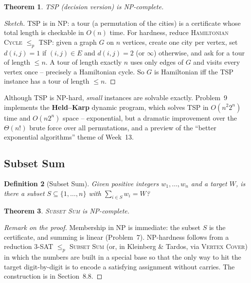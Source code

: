 \documentclass[11pt]{article}
\newtheorem{theorem}{Theorem}[section]
\newtheorem{definition}[theorem]{Definition}
\begin{document}
\begin{theorem}
\textsc{TSP} (decision version) is NP-complete.
\end{theorem}

\begin{proof}[Sketch]
\textsc{TSP} is in $\mathrm{NP}$: a tour (a permutation of the cities) is a certificate
whose total length is checkable in $O(n)$ time. For hardness, reduce \textsc{Hamiltonian
Cycle} $\le_p$ \textsc{TSP}: given a graph $G$ on $n$ vertices, create one city per vertex,
set $d(i, j) = 1$ if $(i, j) \in E$ and $d(i, j) = 2$ (or $\infty$) otherwise, and ask for
a tour of length $\le n$. A tour of length exactly $n$ uses only edges of $G$ and visits
every vertex once -- precisely a Hamiltonian cycle. So $G$ is Hamiltonian iff the TSP
instance has a tour of length $\le n$.
\end{proof}

Although TSP is NP-hard, \emph{small} instances are solvable exactly. Problem~9 implements
the \textbf{Held--Karp} dynamic program, which solves TSP in $O(n^2 2^n)$ time and $O(n
2^n)$ space -- exponential, but a dramatic improvement over the $\Theta(n!)$ brute force
over all permutations, and a preview of the ``better exponential algorithms'' theme of
Week~13.

\subsection{Subset Sum}

\begin{definition}[Subset Sum]
Given positive integers $w_1, \ldots, w_n$ and a target $W$, is there a subset $S \subseteq
\{1, \ldots, n\}$ with $\sum_{i \in S} w_i = W$?
\end{definition}

\begin{theorem}
\textsc{Subset Sum} is NP-complete.
\end{theorem}

\begin{proof}[Remark on the proof]
Membership in $\mathrm{NP}$ is immediate: the subset $S$ is the certificate, and summing is
linear (Problem~7). NP-hardness follows from a reduction \textsc{3-SAT} $\le_p$
\textsc{Subset Sum} (or, in Kleinberg \& Tardos, via \textsc{Vertex Cover}) in which the
numbers are built in a special base so that the only way to hit the target digit-by-digit
is to encode a satisfying assignment without carries. The construction is in Section~8.8.
\end{proof}
\end{document}
